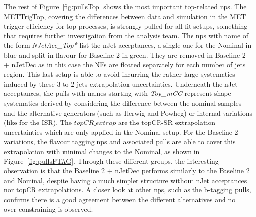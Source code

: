 The rest of Figure~\ref{fig:pullsTop} shows the most important top-related \gls{np}s. The METTrigTop, covering the differences between data and simulation in the MET trigger efficiency for top processes, is strongly pulled for all fit setups, something that requires further investigation from the analysis team. The \gls{np}s with name of the form \textit{NJetAcc\_Top*} list the nJet acceptances, a single one for the Nominal in blue and split in flavour for Baseline 2 in green. They are removed in Baseline 2 + nJetDec as in this case the NFs are floated separately for each number of jets region. This last setup is able to avoid incurring the rather large systematics induced by these 3-to-2 jets extrapolation uncertainties. Underneath the nJet acceptances, the pulls with names starting with \textit{Top\_mCC} represent shape systematics derived by considering the difference between the nominal samples and the alternative generators (such as Herwig and Powheg) or internal variations (like for the ISR). The $topCR\_extrap$ are the topCR-SR extrapolation uncertainties which are only applied in the Nominal setup. For the Baseline 2 variations, the flavour tagging \gls{np}s and associated pulls are able to cover this extrapolation with minimal changes to the Nominal, as shown in Figure~\ref{fig:pullsFTAG}. Through these different groups, the interesting observation is that the Baseline 2 + nJetDec performs similarly to the Baseline 2 and Nominal, despite having a much simpler structure without nJet acceptances nor topCR extrapolations. A closer look at other \gls{np}s, such as the b-tagging pulls, confirms there is a good agreement between the different alternatives and no over-constraining is observed. \\

